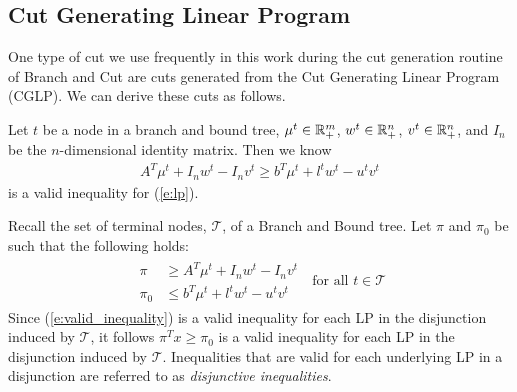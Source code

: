 \documentclass[10pt]{article}
\begin{document}
	\subsection{Cut Generating Linear Program} \label{ss:cglp}
	One type of cut we use frequently in this work during the cut generation routine of Branch and Cut are cuts generated from the Cut Generating Linear Program (CGLP). We can derive these cuts as follows.
	
	Let $ t $ be a node in a branch and bound tree, $ \mu^t \in \mathbb{R}_+^m $, $ w^t \in \mathbb{R}_+^n $, $ v^t \in \mathbb{R}_+^n $, and $ I_n $ be the $ n $-dimensional identity matrix. Then we know
	\begin{align}
		A^T \mu^t + I_n w^t - I_n v^t \geq b^T \mu^t + l^t w^t - u^t v^t \label{e:valid_inequality}
	\end{align}
	is a valid inequality for (\ref{e:lp}).
	
	Recall the set of terminal nodes, $ \mathcal{T} $, of a Branch and Bound tree. Let $ \pi $ and $ \pi_0 $ be such that the following holds:
	\begin{align}
		\begin{split}
			\pi &\geq A^T \mu^t + I_n w^t - I_n v^t \\
			\pi_0 & \leq b^T \mu^t + l^t w^t - u^t v^t
		\end{split} \; \text{ for all } t \in \mathcal{T} \label{e:disjunctive_inequality}
	\end{align}
	Since (\ref{e:valid_inequality}) is a valid inequality for each LP in the disjunction induced by $ \mathcal{T} $, it follows $ \pi^T x \geq \pi_0 $ is a valid inequality for each LP in the disjunction induced by $ \mathcal{T} $. Inequalities that are valid for each underlying LP in a disjunction are referred to as \textit{disjunctive inequalities}.
	
\end{document}
